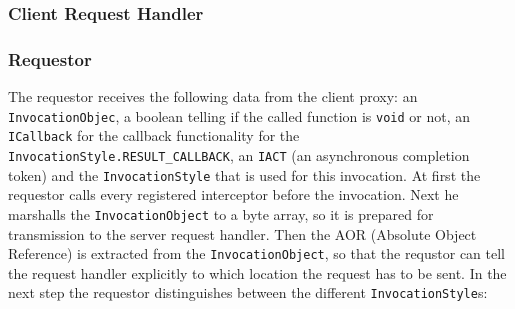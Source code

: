 \subsubsection{Client Request Handler}

\subsubsection{Requestor}
The requestor receives the following data from the client proxy: an \texttt{InvocationObjec}, a boolean telling if the called function is \texttt{void} or not, an \texttt{ICallback} for the callback functionality for the \texttt{InvocationStyle.RESULT\_CALLBACK}, an \texttt{IACT} (an asynchronous completion token) and the \texttt{InvocationStyle} that is used for this invocation. At first the requestor calls every registered interceptor before the invocation. Next he marshalls the \texttt{InvocationObject} to a byte array, so it is prepared for transmission to the server request handler. Then the AOR (Absolute Object Reference) is extracted from the \texttt{InvocationObject}, so that the requstor can tell the request handler explicitly to which location the request has to be sent. In the next step the requestor distinguishes between the different \texttt{InvocationStyle}s:
